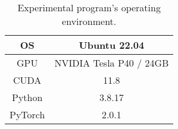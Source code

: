 \begin{table}
    \centering
    \begin{tabular}{ | c | c | }
      \hline
      OS & Ubuntu 22.04  \\ 
      \hline
      GPU & NVIDIA Tesla P40 / 24GB \\
      \hline
      CUDA & 11.8 \\ 
      \hline
      Python & 3.8.17  \\
      \hline
      PyTorch & 2.0.1 \\
      \hline  
    \end{tabular}
    \caption{Experimental program's operating environment.}
    \label{table:code_env}
  \end{table}